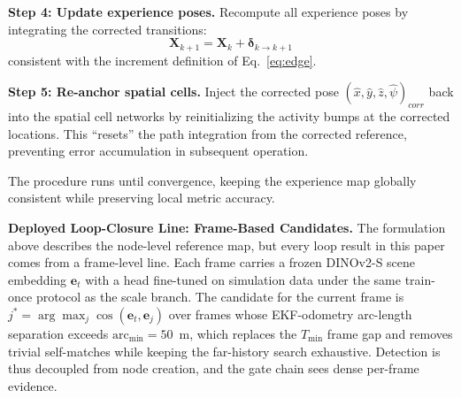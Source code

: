\textbf{Step 4: Update experience poses.} Recompute all experience poses by integrating the corrected transitions:
\begin{equation}
    \mathbf{X}_{k+1} = \mathbf{X}_{k} + \boldsymbol{\delta}_{k \to k+1}
\end{equation}
consistent with the increment definition of Eq.~\eqref{eq:edge}.

\textbf{Step 5: Re-anchor spatial cells.} Inject the corrected pose $(\hat{x}, \hat{y}, \hat{z}, \hat{\psi})_{corr}$ back into the spatial cell networks by reinitializing the activity bumps at the corrected locations. This ``resets'' the path integration from the corrected reference, preventing error accumulation in subsequent operation.

The procedure runs until convergence, keeping the experience map globally consistent while preserving local metric accuracy.

\textbf{Deployed Loop-Closure Line: Frame-Based Candidates.} The formulation above describes the node-level reference map, but every loop result in this paper comes from a frame-level line. Each frame carries a frozen DINOv2-S scene embedding $\mathbf{e}_t$ with a head fine-tuned on simulation data under the same train-once protocol as the scale branch. The candidate for the current frame is $j^{*} = \arg\max_{j} \cos(\mathbf{e}_t, \mathbf{e}_j)$ over frames whose EKF-odometry arc-length separation exceeds $\mathrm{arc}_{\min} = 50$~m, which replaces the $T_{\min}$ frame gap and removes trivial self-matches while keeping the far-history search exhaustive. Detection is thus decoupled from node creation, and the gate chain sees dense per-frame evidence.

